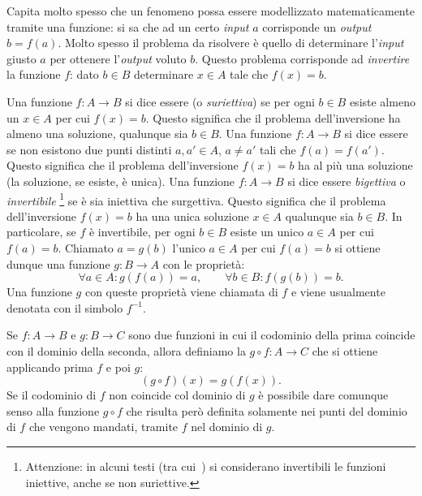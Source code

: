 Capita molto spesso che un fenomeno possa essere modellizzato matematicamente
tramite una funzione: si sa che ad un certo \emph{input} $a$ corrisponde
un \emph{output} $b=f(a)$. Molto spesso il problema da risolvere è
quello di determinare l'\emph{input} giusto $a$ per ottenere l'\emph{output}
voluto $b$. Questo problema corrisponde ad \emph{invertire} la funzione $f$:
dato $b\in B$ determinare $x\in A$ tale che $f(x) = b$.

Una funzione $f\colon A \to B$ si dice essere  (o \emph{suriettiva})
se per ogni $b\in B$ esiste almeno un $x\in A$ per cui $f(x)=b$. Questo
significa che il problema dell'inversione ha almeno una soluzione, qualunque
sia $b\in B$.
Una funzione $f\colon A \to B$ si dice essere 
se non esistono due punti distinti $a,a' \in A$, $a\neq a'$ tali
che $f(a) = f(a')$. Questo significa che il problema dell'inversione
$f(x)=b$ ha al più una soluzione (la soluzione, se esiste, è unica).
Una funzione $f\colon A \to B$ si dice essere \emph{bigettiva}
%
%
%
%
%
o
\emph{invertibile}%
\footnote{Attenzione: in alcuni testi (tra cui~\cite{Giusti}) si considerano
invertibili le funzioni iniettive, anche se non suriettive.}
se è sia iniettiva che surgettiva. Questo significa
che il problema dell'inversione $f(x)=b$ ha una unica soluzione $x\in A$
qualunque sia $b\in B$. In particolare, se $f$ è invertibile, per ogni $b\in B$ esiste
un unico $a\in A$ per cui $f(a)=b$.
Chiamato $a=g(b)$ l'unico $a\in A$ per cui $f(a)=b$
si ottiene dunque una funzione $g\colon B\to A$ con le proprietà:
\[
  \forall a\in A\colon g(f(a)) = a, \qquad
  \forall b\in B\colon f(g(b)) = b.
\]
Una funzione $g$ con queste proprietà viene chiamata 
di $f$ e viene usualmente denotata con il simbolo $f^{-1}$.

Se $f\colon A \to B$ e $g\colon B \to C$ sono due funzioni in cui
il codominio della prima coincide con il dominio della seconda, allora
definiamo la  $g\circ f\colon A \to C$
che si ottiene applicando prima $f$ e poi $g$:
\[
  (g\circ f)(x) = g(f(x)).
\]
Se il codominio di $f$ non coincide col dominio
di $g$ è possibile dare comunque senso alla funzione $g\circ f$
che risulta però definita solamente nei punti del dominio di
$f$ che vengono mandati, tramite $f$ nel dominio di $g$.

